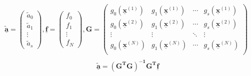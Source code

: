 \begin{align}
\begin{split} \label{eq:guess}
\underline{\boldsymbol{\tilde{a}}} = 
\begin{pmatrix}
  \tilde{a}_0 \\
  \tilde{a}_1 \\
  \vdots \\
  \tilde{a}_s
\end{pmatrix},
\underline{\boldsymbol{f}} = 
\begin{pmatrix}
  f_0 \\
  f_1 \\
  \vdots \\
  f_N
\end{pmatrix},
\boldsymbol{G} = 
 \begin{pmatrix}
  g_{0} \left( \underline{\boldsymbol{x}}^{\left( 1 \right)} \right) & g_{1} \left( \underline{\boldsymbol{x}}^{\left( 1 \right)} \right) & \cdots & g_{s} \left( \underline{\boldsymbol{x}}^{\left( 1 \right)} \right) \\
  g_{0} \left( \underline{\boldsymbol{x}}^{\left( 2 \right)} \right) & g_{1} \left( \underline{\boldsymbol{x}}^{\left( 2 \right)} \right) & \cdots & g_{s} \left( \underline{\boldsymbol{x}}^{\left( 2 \right)} \right) \\
  \vdots  & \vdots  & \ddots & \vdots  \\
  g_{0} \left( \underline{\boldsymbol{x}}^{\left( N \right)} \right) & g_{1} \left( \underline{\boldsymbol{x}}^{\left( N \right)} \right) & \cdots & g_{s} \left( \underline{\boldsymbol{x}}^{\left( N \right)} \right) \\
 \end{pmatrix}
\end{split}
\end{align}
\begin{align}
& \underline{\boldsymbol{\tilde{a}}} = \boldsymbol{\left( G^TG \right)^{-1}G^T}\underline{\boldsymbol{f}} 
\end{align}

